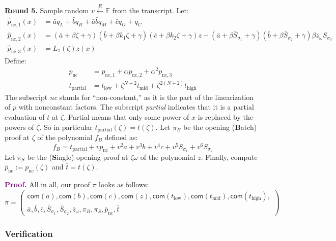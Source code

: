 \documentclass[../lecture-notes.tex]{subfiles}
\begin{document}
\textcolor{green!60!black}{\textbf{Round 5.}} Sample random $v \xleftarrow{R}
\mathbb{F}$ from the transcript. Let:
\begin{align*}
\hat{p}_{\text{nc},1}(x) &= \bar{a}q_L + \bar{b}q_R + \bar{a}\bar{b}q_M + \bar{c}q_O + q_C \\
\hat{p}_{\text{nc},2}(x) &= (\bar{a} + \beta \zeta + \gamma)(\bar{b} + \beta k_1 \zeta + \gamma)(\bar{c} + \beta k_2 \zeta + \gamma) z
- (\bar{a} + \beta \bar{S}_{\sigma_1} + \gamma)(\bar{b} + \beta \bar{S}_{\sigma_2} + \gamma)\beta \overline{z}_{\omega}S_{\sigma_3} \\
\hat{p}_{\text{nc},3}(x) &= L_1(\zeta)z(x)
\end{align*}
Define:
\begin{align*}
p_{\text{nc}} &= p_{\text{nc},1} + \alpha p_{\text{nc}, 2} + \alpha^2 p_{\text{nc}, 3} \\
t_{\text{partial}} &= t_{\text{low}} + \zeta^{N+2}t_{\text{mid}} + \zeta^{2(N+2)}t_{\text{high}}
\end{align*}
The subscript \emph{nc} stands for ``non-constant,'' as it is the part of the
linearization of $p$ with nonconstant factors. The subscript \emph{partial} indicates
that it is a partial evaluation of $t$ at $\zeta$. Partial means that only some
power of $x$ is replaced by the powers of $\zeta$. So in particular
$t_{\text{partial}}(\zeta) = t(\zeta)$. Let $\pi_B$ be the opening (\textbf{B}atch) proof at
$\zeta$ of the polynomial $f_B$ defined as: 
\[
f_B = t_{\text{partial}} + v p_{\text{nc}} + v^2 a + v^3 b + v^4 c + v^5 S_{\sigma_1} + v^6 S_{\sigma_2}
\]
Let $\pi_{S}$ be the (\textbf{S}ingle) opening proof at $\zeta\omega$ of the polynomial
$z$. Finally, compute $\bar{p}_{\text{nc}} := p_{\text{nc}}(\zeta)$ and $\bar{t} = t(\zeta)$.

\textcolor{purple}{\textbf{Proof.}} All in all, our proof $\pi$ looks as follows:
\begin{equation*}
    \pi = \begin{pmatrix}\mathsf{com}(a), \mathsf{com}(b), \mathsf{com}(c), \mathsf{com}(z), \mathsf{com}(t_{\text{low}}), \mathsf{com}(t_{\text{mid}}), \mathsf{com}(t_{\text{high}}), \\
        \bar{a}, \bar{b}, \bar{c}, \bar{S}_{\sigma_1}, \bar{S}_{\sigma_2}, \bar{z}_{\omega}, \pi_{B}, \pi_{S}, \bar{p}_{\text{nc}}, \bar{t}
    \end{pmatrix}
\end{equation*}

\subsubsection{Verification}
\end{document}
